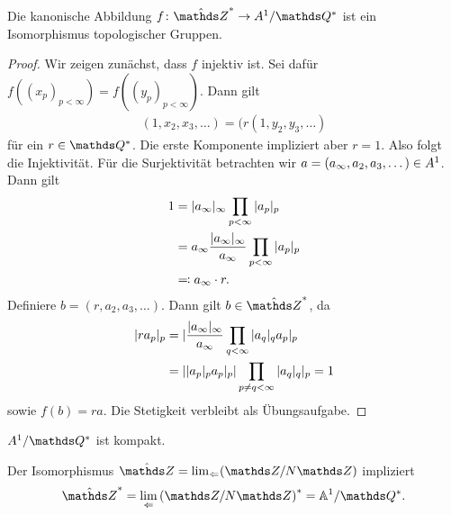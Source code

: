 \begin{prop}
Die kanonische Abbildung $f \colon \hat{\Z}^\ast \to \\A^1/\Q^\ast$
ist ein Isomorphismus topologischer Gruppen.
\end{prop}
\begin{proof}
Wir zeigen zunächst, dass $f$ injektiv ist.
Sei dafür $f((x_p)_{p<\infty})=f((y_p)_{p<\infty})$. Dann gilt
\begin{align*}
(1,x_2,x_3,\dots)=(r (1,y_2,y_3,\dots)
\end{align*}
für ein $r\in \Q^\ast$.
Die erste Komponente impliziert aber $r=1$. Also folgt die Injektivität.
Für die Surjektivität betrachten wir $a=(a_\infty,a_2,a_3,\dots)\in \\A^1$. Dann gilt
\begin{align*}
1&=|a_\infty|_\infty \prod_{p<\infty}|a_p|_p\\
&=a_\infty \frac{|a_\infty|_\infty}{a_\infty}\prod_{p<\infty} |a_p|_p\\
&\eqqcolon a_\infty \cdot r.
\end{align*}
Definiere $b=(r,a_2,a_3,\dots)$. Dann gilt $b \in \hat{\Z}^\ast$, da
\begin{align*}
|r a_p|_p&=|\frac{|a_\infty|_\infty}{a_\infty}\prod_{q<\infty} |a_q|_q a_p|_p\\
&=||a_p|_p a_p|_p |\prod_{p\not =q <\infty} |a_q|_q|_p=1
\end{align*}
sowie
$f(b)=ra$.
Die Stetigkeit verbleibt als Übungsaufgabe.
\end{proof}

\begin{cor}
$\\A^1/\Q^\ast$ ist kompakt.
\end{cor}

Der Isomorphismus $\hat{\Z}=\lim_{\Leftarrow} (\Z/N\Z)$ impliziert
\begin{align*}
\hat{\Z}^\ast=\lim_{\Leftarrow} \left(\Z/N\Z\right)^\ast=\A^1/\Q^\ast.
\end{align*}